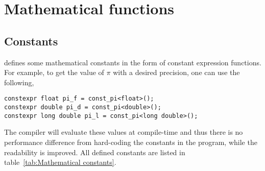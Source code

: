 %
%
%
%

\chapter{Mathematical functions}
\label{chap:Mathemtical functions}

\section{Constants}
\label{sec:Constants}

\mckl defines some mathematical constants in the form of constant expression
functions. For example, to get the value of $\pi$ with a desired precision, one
can use the following,
\begin{Verbatim}
constexpr float pi_f = const_pi<float>();
constexpr double pi_d = const_pi<double>();
constexpr long double pi_l = const_pi<long double>();
\end{Verbatim}
The compiler will evaluate these values at compile-time and thus there is no
performance difference from hard-coding the constants in the program, while the
readability is improved. All defined constants are listed in
table~\ref{tab:Mathematical constants}.

